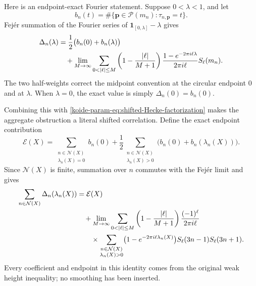 Here is an endpoint-exact Fourier statement.  Suppose $0<\lambda<1$, and
let
\begin{equation}
 b_n(t)=\#\{\mathbf p\in\mathcal P(m_n):\tau_{n,\mathbf p}=t\}.
 \label{koide-param-eq:b-n}
\end{equation}
Fej\'er summation of the Fourier series of
$\mathbf1_{[0,\lambda]}-\lambda$ gives
\begin{align}
 \Delta_n(\lambda)
 &=\frac12\bigl(b_n(0)+b_n(\lambda)\bigr)\notag\\
 &\quad+
 \lim_{M\to\infty}
 \sum_{0<|\ell|\leq M}
 \left(1-\frac{|\ell|}{M+1}\right)
 \frac{1-e^{-2\pi i\ell\lambda}}{2\pi i\ell}
 S_\ell(m_n).
 \label{koide-param-eq:Fejer-exact}
\end{align}
The two half-weights correct the midpoint convention at the circular
endpoint $0$ and at $\lambda$.  When $\lambda=0$, the exact value is
simply $\Delta_n(0)=b_n(0)$.

Combining this with \eqref{koide-param-eq:shifted-Hecke-factorization} makes the
aggregate obstruction a literal shifted correlation.  Define the exact
endpoint contribution
\begin{equation}
 \mathcal E(X)=
 \sum_{\substack{n\in\mathcal N(X)\\\lambda_n(X)=0}}b_n(0)
 +\frac12
 \sum_{\substack{n\in\mathcal N(X)\\\lambda_n(X)>0}}
       \bigl(b_n(0)+b_n(\lambda_n(X))\bigr).
 \label{koide-param-eq:endpoint-aggregate}
\end{equation}
Since $\mathcal N(X)$ is finite, summation over $n$ commutes with the
Fej\'er limit and gives
\begin{align}
 \sum_{n\in\mathcal N(X)}\Delta_n(\lambda_n(X))
 &=\mathcal E(X)\notag\\
 &\quad+\lim_{M\to\infty}
 \sum_{0<|\ell|\leq M}
 \left(1-\frac{|\ell|}{M+1}\right)
 \frac{(-1)^\ell}{2\pi i\ell}\notag\\
 &\qquad\times
 \sum_{\substack{n\in\mathcal N(X)\\\lambda_n(X)>0}}
 \bigl(1-e^{-2\pi i\ell\lambda_n(X)}\bigr)
 S_\ell(3n-1)S_\ell(3n+1).
 \label{koide-param-eq:exact-shifted-Hecke-correlation}
\end{align}
Every coefficient and endpoint in this identity comes from the original
weak height inequality; no smoothing has been inserted.

